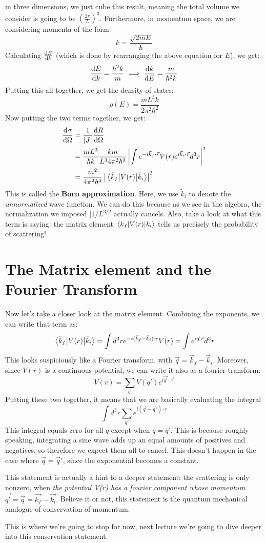 in three dimensions, we just cube this result, meaning the total volume we consider is going to be $\left( \frac{2\pi}{L} \right)^3$. Furthermore, in momentum space, we are considering momenta of the form:
\[
k = \frac{\sqrt{2mE}}{\hbar}
\]
Calculating $\dv{E}{k}$ (which is done by rearranging the above equation for $E$), we get: 
\[
	\dv{E}{k} = \frac{\hbar^2 k}{m} \implies \dv{k}{E} = \frac{m}{\hbar^2 k}
\] 
Putting this all together, we get the density of states: 
\[
\rho(E) = \frac{mL^3k}{2\pi^2 \hbar^2}
\] 
Now putting the two terms together, we get: 
\begin{align*}
	\dv{\sigma}{\Omega} &= \frac{1}{|J|}\dv{R}{\Omega}\\
						 &= \frac{mL^3}{\hbar k} \frac{km}{L^3 4\pi^2 \hbar^3}\left|\int e^{-i \vec k_f \cdot 
						 \vec r} V(r) e^{i\vec k_i \cdot \vec r} d^3r \right|^2\\
						 &= \frac{m^2}{4\pi^2 \hbar^4}\left|\mel{\tilde k_f}{V(r)}{\tilde k_i}\right|^2 \\
\end{align*}
This is called the \textbf{Born approximation}.  
Here, we use $\tilde k_i$ to denote the \textit{unnormalized} wave function. We can do this because as we see
in the algebra, the normalization we imposed $|1/L^{3/2}$ actually cancels. 
Also, take a look at what this term is saying: the matrix element $\mel{k_f}{V(r)}{k_i}$ tells us precisely the probability of scattering!
\section{The Matrix element and the Fourier Transform}
Now let's take a closer look at the matrix element. Combining the exponents, we can write that term as: 
\[ \mel{\tilde k_f}{V(r)}{\tilde k_i} = \int d^3r e^{-i(\vec k_f - \vec k_i) \cdot r} V(r) = \int e^{i\vec{q} \cdot \vec r} d^3r \]
This looks suspiciously like a Fourier transform, with $\vec q = \vec k_f - \vec k_i$. Moreover, since $V(r)$ is a continuous potential, we can write it also as a fourier transform: 
\[ V(r) = \sum_{q'} V(q')e^{i \vec{q'} \cdot \vec r}\]
Putting these two together, it means that we are basically evaluating the integral 
\[ \int d^3r \sum_{q'} e^{i(\vec q - \vec q') \cdot r}\]
This integral equals zero for all $q$ except when $q = q'$. This is because roughly speaking, integrating a sine wave adds up an equal amounts of positives and negatives, so therefore we expect them all to cancel. This doesn't happen in the case where $\vec q = \vec q'$, since the exponential becomes a constant. 

This statement is actually a hint to a deeper statement: the scattering is only nonzero, when \textit{the potential V(r) has a fourier component whose momentum $\vec{q'} = \vec q = \vec{k_f} - \vec{k_i}$}. Believe it or not, this statement is the quantum mechanical analogue of conservation of momentum.  

This is where we're going to stop for now, next lecture we're going to dive deeper into this conservation statement. 

